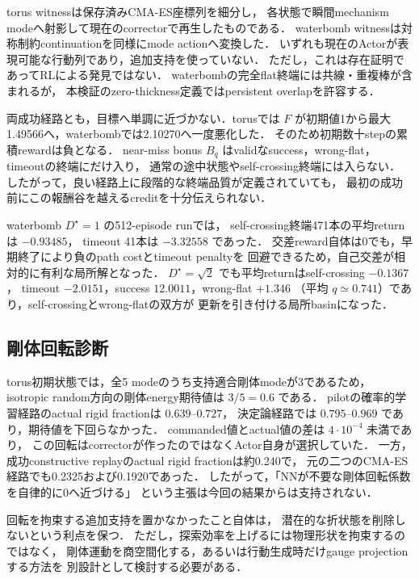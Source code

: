\documentclass[a4paper,11pt]{ltjsarticle}
\begin{document}
torus witnessは保存済みCMA-ES座標列を細分し，
各状態で瞬間mechanism modeへ射影して現在のcorrectorで再生したものである．
waterbomb witnessは対称制約continuationを同様にmode actionへ変換した．
いずれも現在のActorが表現可能な行動列であり，追加支持を使っていない．
ただし，これは存在証明であってRLによる発見ではない．
waterbombの完全flat終端には共線・重複棒が含まれるが，
本検証のzero-thickness定義ではpersistent overlapを許容する．

両成功経路とも，目標へ単調に近づかない．torusでは
$F$ が初期値1から最大1.49566へ，waterbombでは2.10270へ一度悪化した．
そのため初期数十stepの累積rewardは負となる．
near-miss bonus $B_q$ はvalidなsuccess，wrong-flat，timeoutの終端にだけ入り，
通常の途中状態やself-crossing終端には入らない．
したがって，良い経路上に段階的な終端品質が定義されていても，
最初の成功前にこの報酬谷を越えるcreditを十分伝えられない．

waterbomb $D^\star=1$ の512-episode runでは，
self-crossing終端471本の平均returnは $-0.93485$，
timeout 41本は $-3.32558$ であった．
交差reward自体は0でも，早期終了により負のpath costとtimeout penaltyを
回避できるため，自己交差が相対的に有利な局所解となった．
$D^\star=\sqrt2$ でも平均returnはself-crossing $-0.1367$，
timeout $-2.0151$，success $12.0011$，wrong-flat $+1.346$
（平均 $q\simeq0.741$）であり，self-crossingとwrong-flatの双方が
更新を引き付ける局所basinになった．

\subsection{剛体回転診断}

torus初期状態では，全5 modeのうち支持適合剛体modeが3であるため，
isotropic random方向の剛体energy期待値は $3/5=0.6$ である．
pilotの確率的学習経路のactual rigid fractionは $0.639$--$0.727$，
決定論経路では $0.795$--$0.969$ であり，期待値を下回らなかった．
commanded値とactual値の差は $4\cdot10^{-4}$ 未満であり，
この回転はcorrectorが作ったのではなくActor自身が選択していた．
一方，成功constructive replayのactual rigid fractionは約0.240で，
元の二つのCMA-ES経路でも0.2325および0.1920であった．
したがって，「NNが不要な剛体回転係数を自律的に0へ近づける」
という主張は今回の結果からは支持されない．

回転を拘束する追加支持を置かなかったこと自体は，
潜在的な折状態を削除しないという利点を保つ．
ただし，探索効率を上げるには物理形状を拘束するのではなく，
剛体運動を商空間化する，あるいは行動生成時だけgauge projectionする方法を
別設計として検討する必要がある．
\end{document}
